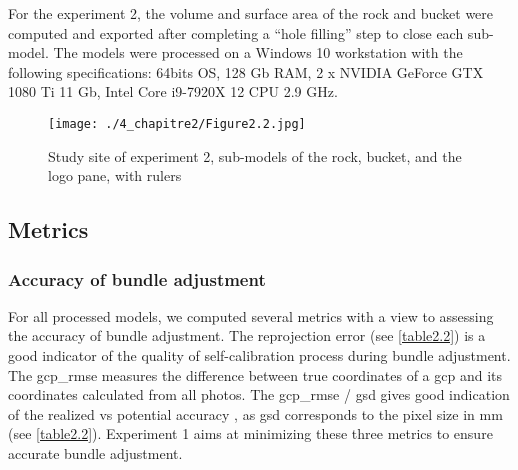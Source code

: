 For the experiment 2, the volume and surface area of the rock and bucket were computed and exported after completing a “hole filling” step to close each sub-model. The models were processed on a Windows 10 workstation with the following specifications: 64bits OS, 128 Gb RAM, 2 x NVIDIA GeForce GTX 1080 Ti 11 Gb, Intel Core i9-7920X 12 CPU 2.9 GHz.

\begin{figure}[H]
	\begin{center}
	\texttt{[image: ./4\_chapitre2/Figure2.2.jpg]}
		\caption[Study site of experiment 2]{Study site of experiment 2, sub-models of the rock, bucket, and the logo pane, with rulers}
	\label{figure2.2}
\end{center}
\end{figure}

\subsection{Metrics}\label{chapitre2_2.3}

\subsubsection{Accuracy of bundle adjustment}\label{chapitre2_2.3.1}
For all processed models, we computed several metrics with a view to assessing the accuracy of bundle adjustment. The reprojection error (see \autoref{table2.2}) is a good indicator of the quality of self-calibration process during bundle adjustment. The \gls{gcp_rmse} measures the difference between true coordinates of a \gls{gcp} and its coordinates calculated from all photos. The \acrshort{gcp_rmse} / \gls{gsd} gives good indication of the realized vs potential accuracy \citep{forstner_photogrammetric_2016}, as \acrshort{gsd} corresponds to the pixel size in mm (see \autoref{table2.2}). Experiment 1 aims at minimizing these three metrics to ensure accurate bundle adjustment.

